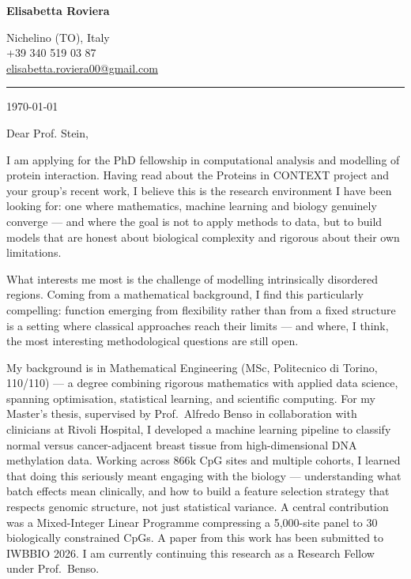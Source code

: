 \documentclass[12pt]{article}
\begin{document}
\noindent
\begin{minipage}[t]{0.45\textwidth}
    {\LARGE \textbf{\textcolor{accentblue}{Elisabetta Roviera}}}
\end{minipage}
\hfill
\begin{minipage}[t]{0.45\textwidth}
    \raggedleft
    {\small
    Nichelino (TO), Italy \\
    +39 340 519 03 87 \\
    \href{mailto:elisabetta.roviera00@gmail.com}{elisabetta.roviera00@gmail.com}
    }
\end{minipage}

\vspace{0.3cm}
{\color{accentblue}\hrule}
\vspace{0.5cm}

\today

\bigskip

Dear Prof. Stein,

I am applying for the PhD fellowship in computational analysis and modelling of protein interaction. Having read about the Proteins in CONTEXT project and your group's recent work, I believe this is the research environment I have been looking for: one where mathematics, machine learning and biology genuinely converge — and where the goal is not to apply methods to data, but to build models that are honest about biological complexity and rigorous about their own limitations.

What interests me most is the challenge of modelling intrinsically disordered regions. Coming from a mathematical background, I find this particularly compelling: function emerging from flexibility rather than from a fixed structure is a setting where classical approaches reach their limits — and where, I think, the most interesting methodological questions are still open.

My background is in Mathematical Engineering (MSc, Politecnico di Torino, 110/110) — a degree combining rigorous mathematics with applied data science, spanning optimisation, statistical learning, and scientific computing. For my Master's thesis, supervised by Prof.\ Alfredo Benso in collaboration with clinicians at Rivoli Hospital, I developed a machine learning pipeline to classify normal versus cancer-adjacent breast tissue from high-dimensional DNA methylation data. Working across 866k CpG sites and multiple cohorts, I learned that doing this seriously meant engaging with the biology — understanding what batch effects mean clinically, and how to build a feature selection strategy that respects genomic structure, not just statistical variance. A central contribution was a Mixed-Integer Linear Programme compressing a 5,000-site panel to 30 biologically constrained CpGs. A paper from this work has been submitted to IWBBIO 2026. I am currently continuing this research as a Research Fellow under Prof.\ Benso.
\end{document}
